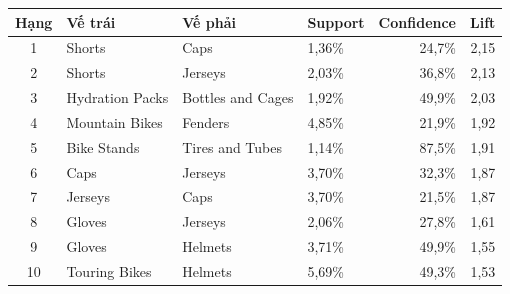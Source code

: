 \begin{tabular}{clllrr}
\toprule
Hạng & Vế trái & Vế phải & Support & Confidence & Lift \\
\midrule
1 & Shorts & Caps & 1,36\% & 24,7\% & 2,15 \\
2 & Shorts & Jerseys & 2,03\% & 36,8\% & 2,13 \\
3 & Hydration Packs & Bottles and Cages & 1,92\% & 49,9\% & 2,03 \\
4 & Mountain Bikes & Fenders & 4,85\% & 21,9\% & 1,92 \\
5 & Bike Stands & Tires and Tubes & 1,14\% & 87,5\% & 1,91 \\
6 & Caps & Jerseys & 3,70\% & 32,3\% & 1,87 \\
7 & Jerseys & Caps & 3,70\% & 21,5\% & 1,87 \\
8 & Gloves & Jerseys & 2,06\% & 27,8\% & 1,61 \\
9 & Gloves & Helmets & 3,71\% & 49,9\% & 1,55 \\
10 & Touring Bikes & Helmets & 5,69\% & 49,3\% & 1,53 \\
\bottomrule
\end{tabular}

